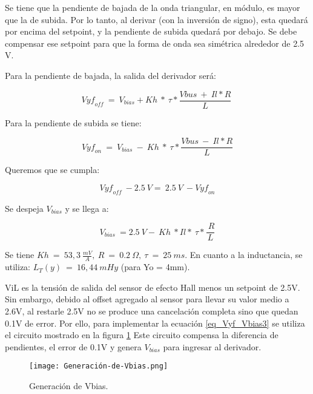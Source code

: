 \noindent Se tiene que la pendiente de bajada de la onda triangular, en m\'{o}dulo, es mayor que la de subida. Por lo tanto, al derivar (con la inversi\'{o}n de signo), esta quedar\'{a} por encima del setpoint, y la pendiente de subida quedar\'{a} por debajo. Se debe compensar ese setpoint para que la forma de onda sea sim\'{e}trica alrededor de 2.5 V. 

\noindent Para la pendiente de bajada, la salida del derivador ser\'{a}:

\begin{equation} \label{eq_Vyf-Vbias}
	{Vyf}_{off}\ =\ V_{bias}+Kh\ *\ \tau *\frac{Vbus\ +\ Il*R}{L}\ 
\end{equation}

\noindent Para la pendiente de subida se tiene:

\begin{equation} \label{eq_Vyf-Vbias2}
	{Vyf}_{on}\ =\ V_{bias}\ -\ Kh\ *\ \tau *\frac{Vbus\ -\ Il*R}{L}
\end{equation}

\noindent Queremos que se cumpla:

\begin{equation} \label{eq_Vyf_Vbias3}
	{Vyf}_{off}\ -2.5\ V=\ 2.5\ V\ -{Vyf}_{on}
\end{equation}

\noindent Se despeja $V_{bias}$ y se llega a:

\begin{equation} \label{eq_Vyf-Vbias4}
	V_{bias}\ =2.5\ V-\ Kh\ *Il*\ \tau *\frac{\ R}{L}
\end{equation}

\noindent Se tiene $Kh\ =\ 53,3\ \frac{mV}{A},\ R\ =\ 0.2\ \mathit{\Omega},\ \tau \ =\ 25\ ms$. En cuanto a la inductancia, se utiliza:  $L_T(y)\ =\ 16,44\ mHy$ (para Yo = 4mm).

\noindent ViL es la tensi\'{o}n de salida del sensor de efecto Hall menos un setpoint de 2.5V. Sin embargo, debido al offset agregado al sensor para llevar su valor medio a 2.6V, al restarle 2.5V no se produce una cancelaci\'{o}n completa sino que quedan 0.1V de error. Por ello, para implementar la ecuaci\'{o}n  \ref{eq_Vyf_Vbias3} se utiliza el circuito mostrado en la figura \ref{fig:img_Generación_de_Vbias} Este circuito compensa la diferencia de pendientes, el error de 0.1V y genera $V_{bias}$ para ingresar al derivador.

\begin{figure}[H]
	\centering
	\texttt{[image: Generación-de-Vbias.png]}
	\caption{Generación de Vbias.}
	\label{fig:img_Generación_de_Vbias}
\end{figure}

